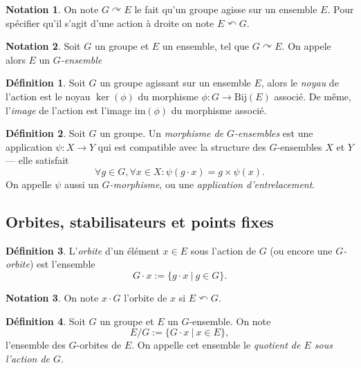 \documentclass[french]{article}
\theoremstyle{plain}
\theoremstyle{remark}
\theoremstyle{definition}
\newtheorem{defn}{Définition}[section]
\newtheorem*{notn}{Notation}
\newcommand{\Bij}{\mathrm{Bij}}
\newcommand{\im}{\mathrm{im}}
\newcommand{\agitg}{\curvearrowright}
\newcommand{\agitd}{\curvearrowleft}
\begin{document}
\begin{notn}
	On note $G \agitg E$ le fait qu'un groupe agisse sur un ensemble $E$.
	Pour spécifier qu'il s'agit d'une action à droite on note $E \agitd G$.
\end{notn}

\begin{notn}
	Soit $G$ un groupe et $E$ un ensemble, tel que $G \agitg E$.
	On appele alors $E$ un \emph{$G$-ensemble}
\end{notn}

\begin{defn}
	Soit $G$ un groupe agissant sur un ensemble $E$,
	alors le \emph{noyau} de l'action est le noyau $\ker(\phi)$ du morphisme
	$\phi : G \to \Bij(E)$ associé. De même, l'\emph{image}
	de l'action est l'image $\im(\phi)$ du morphisme associé.
\end{defn}

\begin{defn}
	Soit $G$ un groupe. Un \emph{morphisme de $G$-ensembles} est une
	application $\psi : X \to Y$ qui est compatible avec
	la structure des $G$-ensembles $X$ et $Y$ --- elle satisfait
	\begin{equation*}
		\forall g \in G, \forall x \in X:
			\psi(g \cdot x) = g \times \psi(x).
	\end{equation*}
	On appelle $\psi$ aussi un \emph{$G$-morphisme},
	ou une \emph{application d'entrelacement}.
\end{defn}

\subsection{Orbites, stabilisateurs et points fixes}

\begin{defn}
	L'\emph{orbite} d'un élément $x \in E$ sous l'action de $G$
	(ou encore une \emph{$G$-orbite}) est l'ensemble
	\begin{equation*}
		G \cdot x := \{g \cdot x\ |\ g \in G\}.
	\end{equation*}
\end{defn}

\begin{notn}
	On note $x \cdot G$ l'orbite de $x$ si $E \agitd G$.
\end{notn}

\begin{defn}
	Soit $G$ un groupe et $E$ un $G$-ensemble. 
	On note
	\begin{equation*}
		E / G := \{ G \cdot x\ |\ x \in E\}, 	
	\end{equation*}
	l'ensemble des $G$-orbites de $E$. On appelle cet
	ensemble le \emph{quotient de $E$ sous l'action de $G$}.
\end{defn}
\end{document}
